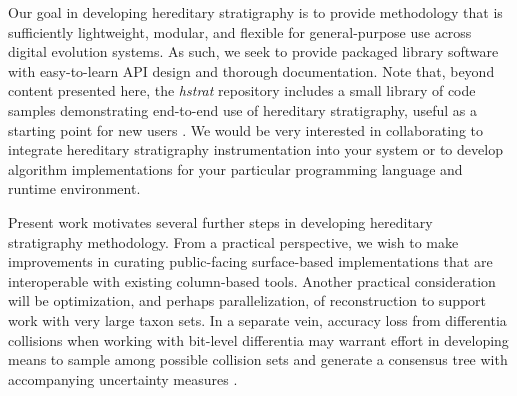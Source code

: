 
Our goal in developing hereditary stratigraphy is to provide methodology that is sufficiently lightweight, modular, and flexible for general-purpose use across digital evolution systems.
As such, we seek to provide packaged library software with easy-to-learn API design and thorough documentation.
Note that, beyond content presented here, the \textit{hstrat} repository includes a small library of code samples demonstrating end-to-end use of hereditary stratigraphy, useful as a starting point for new users \citep{moreno2022hstrat}.
We would be very interested in collaborating to integrate hereditary stratigraphy instrumentation into your system or to develop algorithm implementations for your particular programming language and runtime environment.

Present work motivates several further steps in developing hereditary stratigraphy methodology.
From a practical perspective, we wish to make improvements in curating public-facing surface-based implementations that are interoperable with existing column-based tools.
Another practical consideration will be optimization, and perhaps parallelization, of reconstruction to support work with very large taxon sets.
In a separate vein, accuracy loss from differentia collisions when working with bit-level differentia may warrant effort in developing means to sample among possible collision sets and generate a consensus tree with accompanying uncertainty measures \citep{bryant2003classification}.

